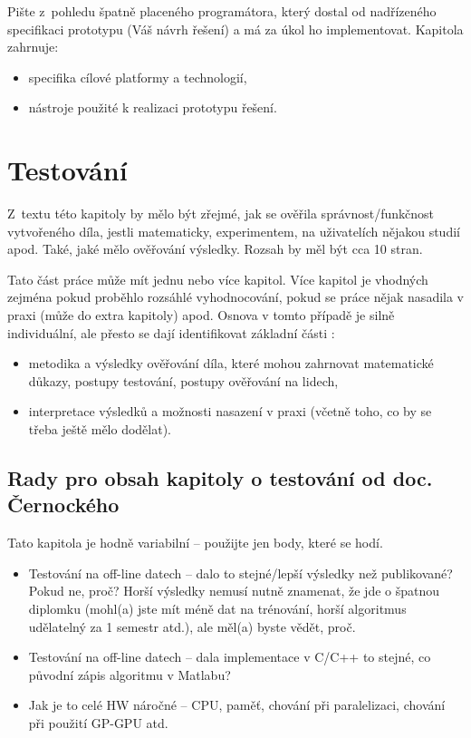 Pište z~pohledu špatně placeného programátora, který dostal od nadřízeného specifikaci prototypu (Váš návrh řešení) a má za úkol ho implementovat. Kapitola zahrnuje:
\begin{itemize}
  \item{specifika cílové platformy a technologií,}
  \item{nástroje použité k realizaci prototypu řešení.}
\end{itemize}


\section{Testování}
\label{testovani}

Z~textu této kapitoly by mělo být zřejmé, jak se ověřila správnost/funkčnost vytvořeného díla, jestli matematicky, experimentem, na uživatelích nějakou studií apod. Také, jaké mělo ověřování výsledky. Rozsah by měl být cca 10 stran.

Tato část práce může mít jednu nebo více kapitol. Více kapitol je vhodných zejména pokud proběhlo rozsáhlé vyhodnocování, pokud se práce nějak nasadila v praxi (může do extra kapitoly) apod. Osnova v tomto případě je silně individuální, ale přesto se dají identifikovat základní části \cite{Zemcik}:
\begin{itemize}
  \item{metodika a výsledky ověřování díla, které mohou zahrnovat matematické důkazy, postupy testování, postupy ověřování na lidech,}
  \item{interpretace výsledků a možnosti nasazení v praxi (včetně toho, co by se třeba ještě mělo dodělat).}
\end{itemize}

\subsection*{Rady pro obsah kapitoly o testování od doc. Černockého}

Tato kapitola je hodně variabilní -- použijte jen body, které se hodí.
\begin{itemize}
  \item{Testování na off-line datech -- dalo to stejné/lepší výsledky než publikované? Pokud ne, proč? Horší výsledky nemusí nutně znamenat, že jde o špatnou diplomku (mohl(a) jste mít méně dat na trénování, horší algoritmus udělatelný za 1 semestr atd.), ale měl(a) byste vědět, proč.}
  \item{Testování na off-line datech -- dala implementace v C/C++ to stejné, co původní zápis algoritmu v Matlabu?}
  \item{Jak je to celé HW náročné -- CPU, paměť, chování při paralelizaci, chování při použití GP-GPU atd.}
\end{itemize}

